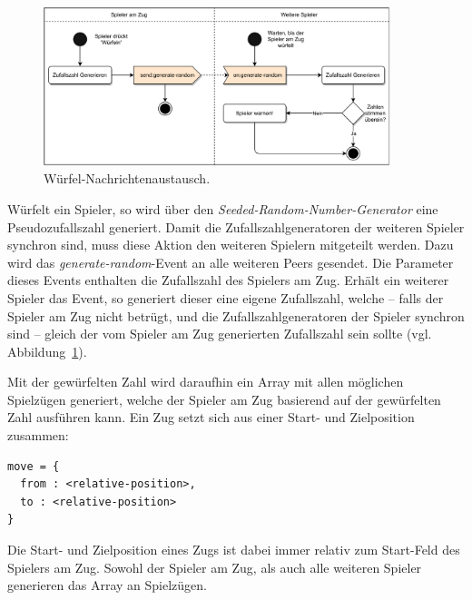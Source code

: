 \vspace{6pt}
\begin{figure}[h]
\centering
\includegraphics[width=0.90\textwidth]{bilder/PDF_SVG/MAEDN_WUERFELN.pdf}
\caption{Würfel-Nachrichtenaustausch.}
\label{fig:maednwuerfeln}
\end{figure}

Würfelt ein Spieler, so wird über den \textit{Seeded-Random-Number-Generator} eine Pseudozufallszahl generiert. Damit die Zufallszahlgeneratoren der weiteren Spieler synchron sind, muss diese Aktion den weiteren Spielern mitgeteilt werden. Dazu wird das \textit{generate-random}-Event an alle weiteren Peers gesendet. Die Parameter dieses Events enthalten die Zufallszahl des Spielers am Zug. Erhält ein weiterer Spieler das Event, so generiert dieser eine eigene Zufallszahl, welche -- falls der Spieler am Zug nicht betrügt, und die Zufallszahlgeneratoren der Spieler synchron sind -- gleich der vom Spieler am Zug generierten Zufallszahl sein sollte (vgl. Abbildung~\ref{fig:maednwuerfeln}).\par 

Mit der gewürfelten Zahl wird daraufhin ein Array mit allen möglichen Spielzügen generiert, welche der Spieler am Zug basierend auf der gewürfelten Zahl ausführen kann. Ein Zug setzt sich aus einer Start- und Zielposition zusammen:

\lstset{style=STYLE_COMMAND_LINE_ARGUMENT_SINGLE_LINE}
\begin{minipage}{\textwidth}
\begin{singlespace}
\begin{lstlisting}[belowskip=-0.8 \baselineskip]
move = {
  from : <relative-position>,
  to : <relative-position>
}
\end{lstlisting}
\end{singlespace}
\end{minipage}
\vspace{5pt}

Die Start- und Zielposition eines Zugs ist dabei immer relativ zum Start-Feld des Spielers am Zug. Sowohl der Spieler am Zug, als auch alle weiteren Spieler generieren das Array an Spielzügen.\par


